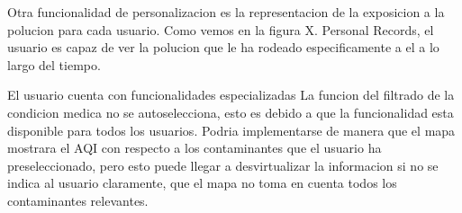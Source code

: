  Otra funcionalidad de personalizacion es la representacion de la exposicion a la polucion para cada usuario. 
 Como vemos en la figura X. Personal Records, el usuario es capaz de ver la polucion que le ha rodeado especificamente
 a el a lo largo del tiempo.

 
\begin{itemize}
    \done El usuario cuenta con funcionalidades especializadas 
    \crossed La funcion del filtrado de la condicion medica no se autoselecciona, esto es debido a que la funcionalidad
    esta disponible para todos los usuarios. Podria implementarse de manera que el mapa mostrara el AQI con respecto a los
    contaminantes que el usuario ha preseleccionado, pero esto puede llegar a desvirtualizar la informacion si no se 
    indica al usuario claramente, que el mapa no toma en cuenta todos los contaminantes relevantes.
\end{itemize}
 \newpage
